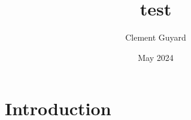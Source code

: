 \documentclass{article}
\title{test}
\author{Clement Guyard}
\date{May 2024}
\begin{document}
\maketitle

\section{Introduction}
\end{document}
